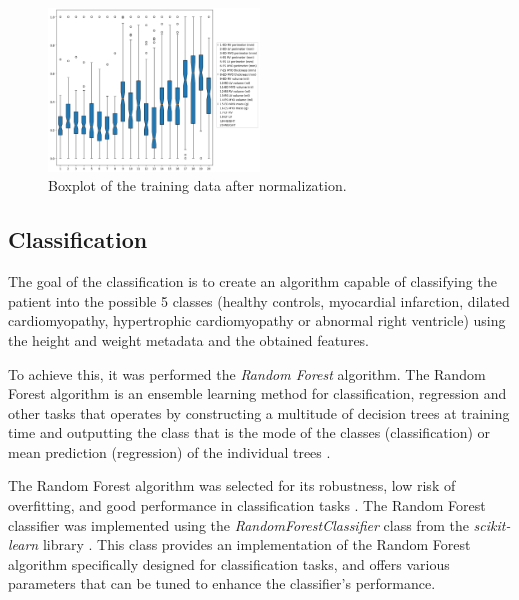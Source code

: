 \documentclass[conference]{IEEEtran}
\begin{document}
    \begin{figure}
        \centering
        \includegraphics[width=0.5\textwidth]{images/boxplot_normalized_data.png}
        \caption{Boxplot of the training data after normalization.}
        \label{fig:data_boxplot_norm}
    \end{figure}

    
    
\subsection{Classification}
        The goal of the classification is to create an algorithm capable of classifying the patient into the possible 5 
        classes (healthy controls, myocardial infarction, dilated cardiomyopathy, hypertrophic cardiomyopathy or abnormal
        right ventricle) using the height and weight metadata and the obtained features.
       
        To achieve this, it was performed the \textit{Random Forest} algorithm. The Random Forest algorithm is 
        an ensemble learning method for classification, regression and other tasks that operates by constructing 
        a multitude of decision trees at training time and outputting the class that is the mode of the classes 
        (classification) or mean prediction (regression) of the individual trees \cite{Breiman2001}. 

        The Random Forest algorithm was selected for its robustness, low risk of overfitting, and good performance in
        classification tasks \cite{Breiman2001}. The Random Forest classifier was implemented using the 
        \textit{RandomForestClassifier} class from the \textit{scikit-learn} library \cite{scikit-learn}. This class 
        provides an implementation of the Random Forest algorithm specifically designed for classification
        tasks, and offers various parameters that can be tuned to enhance the classifier's performance.
\end{document}
